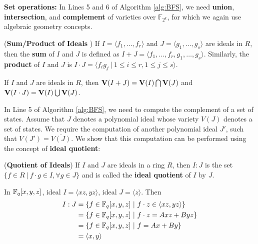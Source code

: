 {\bf Set operations:} In Lines 5 and 6 of
Algorithm  \ref{alg:BFS}, we need  \textbf{union}, 
\textbf{intersection}, and \textbf{complement} of varieties over
$\mathbb{F}_{2^k}$, for which we again use algebraic geometry concepts.

\begin{Definition}
\label{def:sum}
({\bf Sum/Product of Ideals} \cite{ideals:book}) If $I = \langle f_1,
\dots, f_r\rangle$ and $J = \langle g_1, \dots, g_s\rangle$ are
ideals in $R$, then the {\bf sum} of $I$ and $J$ is defined as $I + J
= \langle f_1, \dots, f_r, g_1, \dots, g_s\rangle$. Similarly, the
{\bf product} of $I$ and $J$ is $I \cdot J = \langle
f_ig_j\ |\ 1 \leq i \leq r, 1 \leq j \leq s\rangle$. 
\end{Definition}

\begin{Theorem}
\label{thm:unionintersect}
If $I$ and $J$ are ideals in $R$, then 
${\bf V}(I + J) = {\bf V}(I) \bigcap {\bf V}(J)$ and ${\bf V}(I \cdot
J) = {\bf V}(I) \bigcup {\bf V}(J)$. 
\end{Theorem}


In Line 5 of Algorithm  \ref{alg:BFS}, we need to compute the complement of a
set of states. Assume that $J$ denotes a polynomial ideal whose
variety $V(J)$ denotes a set of states. We require the computation of
another polynomial ideal $J'$, such that $V(J')=\overline{V(J)}$. We
show that this computation can be performed using the concept of {\bf
  ideal quotient}:  

\begin{Definition}
\label{def:quo}
({\bf Quotient of Ideals}) If $I$ and $J$ are ideals in a ring $R$, then $I:J$ is the set
  $\{f \in R \ |\ f\cdot g \in I, \forall g \in J\}$ %
and is called the {\bf ideal quotient} of $I$ by $J$.
\end{Definition}

\begin{Example}
In ${\mathbb{F}}_{q}[x,y,z]$, ideal $I = \langle xz,yz\rangle$, ideal $J = \langle z\rangle$. Then
\begin{align*}
I:J &= \{f\in{\mathbb{F}}_{q}[x,y,z]~|~f\cdot z \in \langle xz,yz\rangle\} \\
&= \{f\in{\mathbb{F}}_{q}[x,y,z]~|~f\cdot z = Axz+Byz\}\\
&= \{f\in{\mathbb{F}}_{q}[x,y,z]~|~f= Ax+By\}\\
&= \langle x,y\rangle
\end{align*}
\end{Example}


